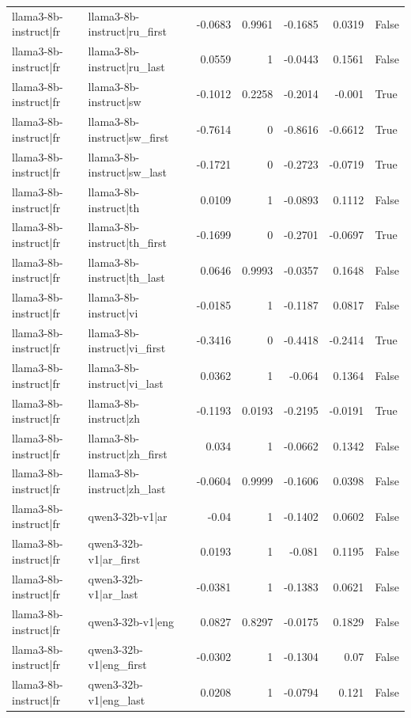\begin{table}
\begin{tabular}{l l r r r r l}
llama3-8b-instruct|fr & llama3-8b-instruct|ru_first & -0.0683 & 0.9961 & -0.1685 & 0.0319 & False \\
llama3-8b-instruct|fr & llama3-8b-instruct|ru_last & 0.0559 & 1 & -0.0443 & 0.1561 & False \\
llama3-8b-instruct|fr & llama3-8b-instruct|sw & -0.1012 & 0.2258 & -0.2014 & -0.001 & True \\
llama3-8b-instruct|fr & llama3-8b-instruct|sw_first & -0.7614 & 0 & -0.8616 & -0.6612 & True \\
llama3-8b-instruct|fr & llama3-8b-instruct|sw_last & -0.1721 & 0 & -0.2723 & -0.0719 & True \\
llama3-8b-instruct|fr & llama3-8b-instruct|th & 0.0109 & 1 & -0.0893 & 0.1112 & False \\
llama3-8b-instruct|fr & llama3-8b-instruct|th_first & -0.1699 & 0 & -0.2701 & -0.0697 & True \\
llama3-8b-instruct|fr & llama3-8b-instruct|th_last & 0.0646 & 0.9993 & -0.0357 & 0.1648 & False \\
llama3-8b-instruct|fr & llama3-8b-instruct|vi & -0.0185 & 1 & -0.1187 & 0.0817 & False \\
llama3-8b-instruct|fr & llama3-8b-instruct|vi_first & -0.3416 & 0 & -0.4418 & -0.2414 & True \\
llama3-8b-instruct|fr & llama3-8b-instruct|vi_last & 0.0362 & 1 & -0.064 & 0.1364 & False \\
llama3-8b-instruct|fr & llama3-8b-instruct|zh & -0.1193 & 0.0193 & -0.2195 & -0.0191 & True \\
llama3-8b-instruct|fr & llama3-8b-instruct|zh_first & 0.034 & 1 & -0.0662 & 0.1342 & False \\
llama3-8b-instruct|fr & llama3-8b-instruct|zh_last & -0.0604 & 0.9999 & -0.1606 & 0.0398 & False \\
llama3-8b-instruct|fr & qwen3-32b-v1|ar & -0.04 & 1 & -0.1402 & 0.0602 & False \\
llama3-8b-instruct|fr & qwen3-32b-v1|ar_first & 0.0193 & 1 & -0.081 & 0.1195 & False \\
llama3-8b-instruct|fr & qwen3-32b-v1|ar_last & -0.0381 & 1 & -0.1383 & 0.0621 & False \\
llama3-8b-instruct|fr & qwen3-32b-v1|eng & 0.0827 & 0.8297 & -0.0175 & 0.1829 & False \\
llama3-8b-instruct|fr & qwen3-32b-v1|eng_first & -0.0302 & 1 & -0.1304 & 0.07 & False \\
llama3-8b-instruct|fr & qwen3-32b-v1|eng_last & 0.0208 & 1 & -0.0794 & 0.121 & False \\

\end{tabular}
\end{table}
